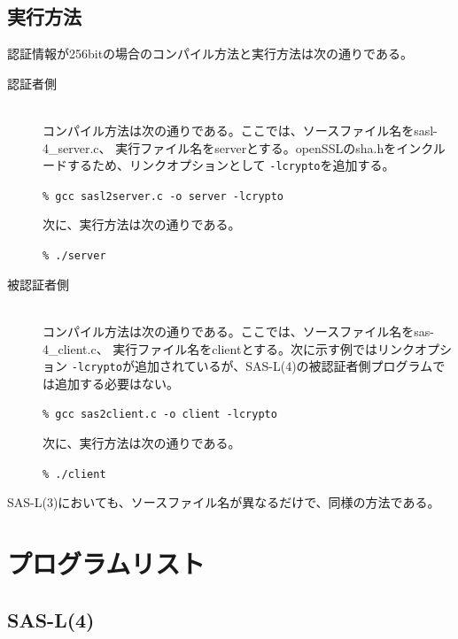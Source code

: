\documentclass{thesis}
\begin{document}
\section{実行方法}
認証情報が256bitの場合のコンパイル方法と実行方法は次の通りである。
	\begin{description}
		\item[認証者側]\mbox{} \\
    \;\;\;コンパイル方法は次の通りである。ここでは、ソースファイル名をsasl-4\_server.c、
			実行ファイル名をserverとする。openSSLのsha.hをインクルードするため、リンクオプションとして
			\verb|-lcrypto|を追加する。
			\begin{screen}
				\verb|% gcc sasl2server.c -o server -lcrypto|
			\end{screen}
			\;\;\;次に、実行方法は次の通りである。
				\begin{screen}
					\verb|% ./server|
				\end{screen}
			\item[被認証者側]\mbox{} \\
      \;\;\;コンパイル方法は次の通りである。ここでは、ソースファイル名をsas-4\_client.c、
				実行ファイル名をclientとする。次に示す例ではリンクオプション
				\verb|-lcrypto|が追加されているが、SAS-L(4)の被認証者側プログラムでは追加する必要はない。
				\begin{screen}
					\verb|% gcc sas2client.c -o client -lcrypto|
				\end{screen}
				\;\;\;次に、実行方法は次の通りである。
				\begin{screen}
					\verb|% ./client|
				\end{screen}	
	\end{description}
	SAS-L(3)においても、ソースファイル名が異なるだけで、同様の方法である。

\chapter{プログラムリスト}
\section{SAS-L(4)}
\end{document}
